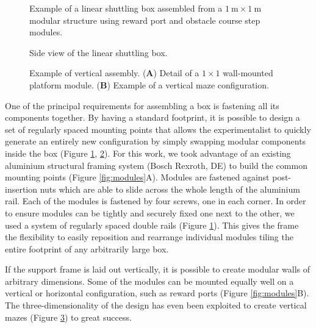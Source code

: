\begin{figure}
\centering

\caption{Example of a linear shuttling box assembled from a $\SI{1}{\meter}\times \SI{1}{\meter}$ modular structure using reward port and obstacle course step modules.}
\label{fig:box}
\end{figure}

\begin{figure}
\centering

\caption{Side view of the linear shuttling box.}
\label{fig:box3d}
\end{figure}

\begin{figure}
\centering

\caption{Example of vertical assembly. (\textbf{A}) Detail of a $1\times 1$ wall-mounted platform module. (\textbf{B}) Example of a vertical maze configuration.}
\label{fig:verticalBox}
\end{figure}

One of the principal requirements for assembling a box is fastening all its components together. By having a standard footprint, it is possible to design a set of regularly spaced mounting points that allows the experimentalist to quickly generate an entirely new configuration by simply swapping modular components inside the box (Figure \ref{fig:box}, \ref{fig:box3d}). For this work, we took advantage of an existing aluminium structural framing system (Bosch Rexroth, DE) to build the common mounting points (Figure \ref{fig:modules}A). Modules are fastened against post-insertion nuts which are able to slide across the whole length of the aluminium rail. Each of the modules is fastened by four screws, one in each corner. In order to ensure modules can be tightly and securely fixed one next to the other, we used a system of regularly spaced double rails (Figure \ref{fig:box}). This gives the frame the flexibility to easily reposition and rearrange individual modules tiling the entire footprint of any arbitrarily large box.

If the support frame is laid out vertically, it is possible to create modular walls of arbitrary dimensions. Some of the modules can be mounted equally well on a vertical or horizontal configuration, such as reward ports (Figure \ref{fig:modules}B). The three-dimensionality of the design has even been exploited to create vertical mazes (Figure \ref{fig:verticalBox}) to great success.

